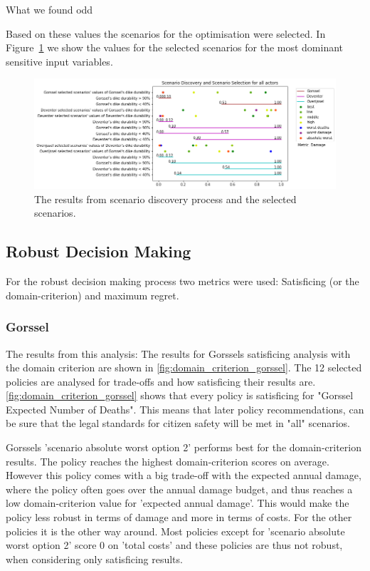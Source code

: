 What we found odd 

Based on these values the scenarios for the optimisation were selected. In Figure~\ref{fig:prim} we show the values for the selected scenarios for the most dominant sensitive input variables.


\begin{figure}[h]
    \centering
    \includegraphics[width=\textwidth]{report/figures/results/scenario_discovery.png}
    \caption{The results from scenario discovery process and the selected scenarios.}
    \label{fig:prim}
\end{figure}


\subsection{Robust Decision Making}
For the robust decision making process two metrics were used: Satisficing (or the domain-criterion) and maximum regret. 
\subsubsection{Gorssel}
The results from this analysis: The results for Gorssels satisficing analysis with the domain criterion are shown in \autoref{fig:domain_criterion_gorssel}. The 12 selected policies are analysed for trade-offs and how satisficing their results are. \newline
\autoref{fig:domain_criterion_gorssel} shows that every policy is satisficing for "Gorssel Expected Number of Deaths". This means that later policy recommendations, can be sure that the legal standards for citizen safety will be met in "all" scenarios. \newline

Gorssels 'scenario absolute worst option 2' performs best for the domain-criterion results. The policy reaches the highest domain-criterion scores on average. However this policy comes with a big trade-off with the expected annual damage, where the policy often goes over the annual damage budget, and thus reaches a low domain-criterion value for 'expected annual damage'. This would make the policy less robust in terms of damage and more in terms of costs. For the other policies it is the other way around. Most policies except for 'scenario absolute worst option 2' score 0 on 'total costs' and these policies are thus not robust, when considering only satisficing results.  


